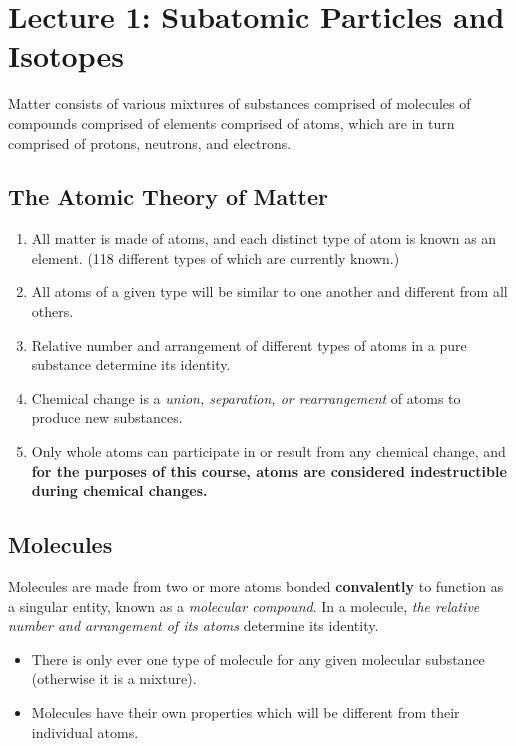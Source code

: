 \section{Lecture 1: Subatomic Particles and Isotopes}

Matter consists of various mixtures of substances comprised of molecules of compounds comprised of elements comprised of atoms, which are in turn comprised of protons, neutrons, and electrons.

\subsection{The Atomic Theory of Matter}

\begin{enumerate}
\item All matter is made of atoms, and each distinct type of atom is known as an element. (118 different types of which are currently known.)
\item All atoms of a given type will be similar to one another and different from all others.
\item Relative number and arrangement of different types of atoms in a pure substance determine its identity.
\item Chemical change is a \textit{union, separation, or rearrangement} of atoms to produce new substances.
\item Only whole atoms can participate in or result from any chemical change, and \textbf{for the purposes of this course, atoms are considered indestructible during chemical changes.}
\end{enumerate}

\subsection{Molecules}

\begin{defn}
Molecules are made from two or more atoms bonded \textbf{convalently} to function as a singular entity, known as a \textit{molecular compound}. In a molecule, \textit{the relative number and arrangement of its atoms} determine its identity.
\end{defn}

\noindent
{}

\begin{itemize}
\item There is only ever one type of molecule for any given molecular substance (otherwise it is a mixture).
\item Molecules have their own properties which will be different from their individual atoms.
\end{itemize}

